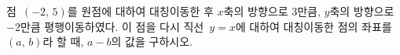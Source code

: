 점~$(-2,\,5)$를 원점에 대하여 대칭이동한 후 $x$축의 방향으로 $3$만큼, $y$축의 방향으로 $-2$만큼 평행이동하였다. 이 점을 다시 직선~$y=x$에 대하여 대칭이동한 점의 좌표를 $(a,\,b)$라 할 때, $a-b$의 값을 구하시오.

